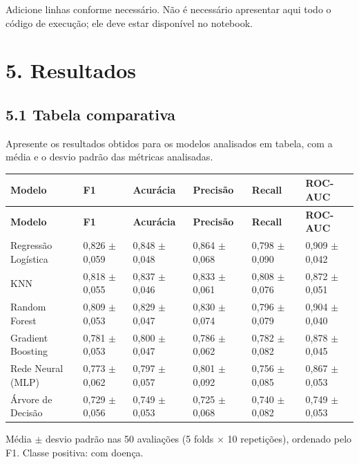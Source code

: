 \documentclass[11pt,letterpaper]{article}
\begin{document}
Adicione linhas conforme necessário. Não é necessário apresentar aqui todo o código de execução; ele deve estar disponível no notebook.

\clearpage

\section*{5. Resultados}

\subsection*{5.1 Tabela comparativa}

Apresente os resultados obtidos para os modelos analisados em tabela, com a média e o desvio padrão das métricas analisadas.

\begingroup
\fontsize{9}{11}\selectfont
\begin{longtable}{|L{106.653pt}|C{63.709pt}|C{63.709pt}|C{63.709pt}|C{63.709pt}|C{63.709pt}|}
\hline
\textbf{Modelo} & \textbf{F1} & \textbf{Acurácia} & \textbf{Precisão} & \textbf{Recall} & \textbf{ROC-AUC} \\ \hline
\endfirsthead
\hline
\textbf{Modelo} & \textbf{F1} & \textbf{Acurácia} & \textbf{Precisão} & \textbf{Recall} & \textbf{ROC-AUC} \\ \hline
\endhead
Regressão Logística & 0,826 \(\pm\) 0,059 & 0,848 \(\pm\) 0,048 & 0,864 \(\pm\) 0,068 & 0,798 \(\pm\) 0,090 & 0,909 \(\pm\) 0,042 \\ \hline
KNN & 0,818 \(\pm\) 0,055 & 0,837 \(\pm\) 0,046 & 0,833 \(\pm\) 0,061 & 0,808 \(\pm\) 0,076 & 0,872 \(\pm\) 0,051 \\ \hline
Random Forest & 0,809 \(\pm\) 0,053 & 0,829 \(\pm\) 0,047 & 0,830 \(\pm\) 0,074 & 0,796 \(\pm\) 0,079 & 0,904 \(\pm\) 0,040 \\ \hline
Gradient Boosting & 0,781 \(\pm\) 0,053 & 0,800 \(\pm\) 0,047 & 0,786 \(\pm\) 0,062 & 0,782 \(\pm\) 0,082 & 0,878 \(\pm\) 0,045 \\ \hline
Rede Neural (MLP) & 0,773 \(\pm\) 0,062 & 0,797 \(\pm\) 0,057 & 0,801 \(\pm\) 0,092 & 0,756 \(\pm\) 0,085 & 0,867 \(\pm\) 0,053 \\ \hline
Árvore de Decisão & 0,729 \(\pm\) 0,056 & 0,749 \(\pm\) 0,053 & 0,725 \(\pm\) 0,068 & 0,740 \(\pm\) 0,082 & 0,749 \(\pm\) 0,053 \\ \hline
\end{longtable}
\endgroup

Média \(\pm\) desvio padrão nas 50 avaliações (5 folds \(\times\) 10 repetições), ordenado pelo F1. Classe positiva: com doença.
\end{document}
